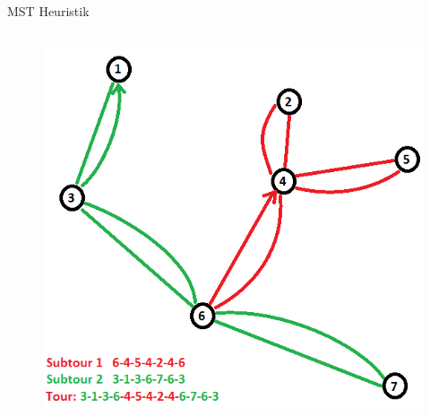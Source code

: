 \begin{frame}{MST Heuristik}
\begin{columns}
\begin{column}{0.5\textwidth}
\begin{figure}
            \includegraphics[scale=0.30]{Hierholzer.png}
        \end{figure}
  	  \end{column}
  \end{columns}
\end{frame}

